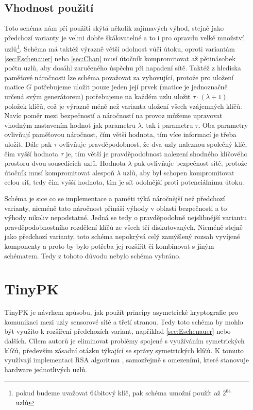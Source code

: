 \documentclass[11pt,final,twoside]{fithesis2}
\begin{document}
\subsection{Vhodnost použití}
Toto schéma nám při použití skýtá několik zajímavých výhod, stejně jako předchozí varianty je velmi dobře škálovatelné a to i pro opravdu velké množství uzlů\footnote{pokud budeme uvažovat 64bitový klíč, 
pak schéma umožní použít až $2^{64}$ uzlů}. Schéma má taktéž výrazně větší odolnost vůči útoku, oproti variantám \ref{sec:Eschenauer} nebo \ref{sec:Chan} musí útočník kompromitovat až pětinásobek počtu uzlů, 
aby dosáhl zaručeného úspěchu při napadení sítě. Taktéž z hlediska paměťové náročnosti lze schéma považovat za vyhovující, protože pro uložení matice $G$ potřebujeme uložit pouze jeden její prvek 
(matice je jednoznačně určená svým generátorem) potřebujeme na každém uzlu uložit $\tau \cdot (\lambda +1)$ položek klíčů, což je výrazně méně než varianta uložení všech vzájemných klíčů. Navíc 
poměr mezi bezpečností a náročností na provoz můžeme upravovat vhodným nastavením hodnot jak parametru $\lambda$, tak i parametru $\tau$. Oba parametry ovlivňují paměťovou náročnost, čím větší hodnota, tím 
více informací je třeba uložit. Dále pak $\tau$ ovlivňuje pravděpodobnost, že dva uzly naleznou společný klíč, čím vyšší hodnota $\tau$ je, tím větší je pravděpodobnost nalezení shodného klíčového prostoru
dvou sousedících uzlů. Hodnota $\lambda$ pak ovlivňuje bezpečnost sítě, protože útočník musí kompromitovat alespoň $\lambda$ uzlů, aby byl schopen kompromitovat celou síť, tedy čím vyšší hodnota, tím 
je síť odolnější proti potenciálnímu útoku.

Schéma je sice co se implementace a paměti týká náročnější než předchozí varianty, nicméně tato náročnost přináší výhody v oblasti bezpečnosti a to výhody nikoliv 
nepodstatné. Jedná se tedy o pravděpodobně nejslibnější variantu pravděpodobnostního rozdělení klíčů ze všech tří diskutovaných. Nicméně stejně jako předchozí varianty, toto schéma nepokrývá celý 
zamýšlený rozsah vyvíjené komponenty a proto by bylo potřeba jej rozšířit či kombinovat s jiným schématem. Tedy z tohoto důvodu nebylo schéma vybráno.

\section{TinyPK}
TinyPK \cite{Watro2004} je návrhem způsobu, jak použít principy asymetrické kryptografie 
pro komunikaci mezi uzly sensorové sítě a třetí stranou. Tedy toto schéma by mohlo být využito k rozšíření předchozích variant, například \ref{sec:Eschenauer}
nebo dalších. Cílem autorů je eliminovat problémy spojené s využíváním 
symetrických klíčů, především zásadní otázku týkající se správy symetrických klíčů. K tomuto využívají
implementaci RSA algoritmu \cite{Rivest1978}, samozřejmě s omezeními, které stanovuje hardware jednotlivých uzlů.
\end{document}
